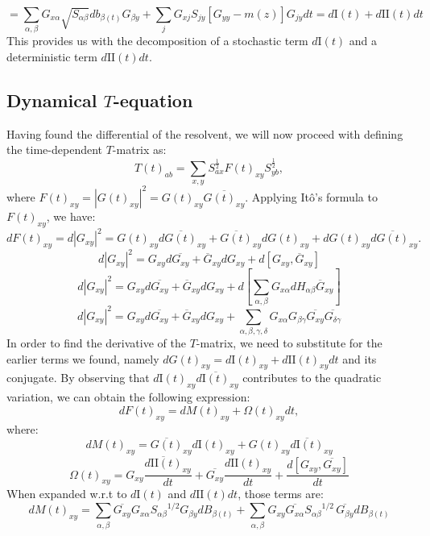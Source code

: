 \documentclass[11pt]{article}
\begin{document}
$$=\sum_{\alpha, \beta}G_{x\alpha}\sqrt{S_{\alpha \beta}}db_{\beta(t)}G_{\beta y}+\sum_j G_{xj}S_{jy}\left[G_{yy}-m(z)\right]G_{jy}dt = d \mathrm{I}(t) + d \mathrm{II}(t)dt$$
This provides us with the decomposition of a stochastic term $d \mathrm{I}(t)$ and a deterministic term $d \mathrm{II}(t)dt$. 


\subsection{Dynamical $T$-equation}
Having found the differential of the resolvent, we will now proceed with defining the time-dependent $T$-matrix as:
$$T(t)_{ab} = \sum_{x,y}S_{ax}^{\frac{1}{2}}F(t)_{xy}S_{yb}^{\frac{1}{2}},$$
where $F(t)_{xy} = |G(t)_{xy}|^2 = G(t)_{xy}\overline{G(t)_{xy}}$. 
Applying Itô's formula to \( F(t)_{xy} \), we have:
\[
dF(t)_{xy}= d|G_{xy}|^2= G(t)_{xy} d\overline{G(t)}_{xy} + \overline{G(t)}_{xy} dG(t)_{xy} + dG(t)_{xy} d\overline{G(t)}_{xy}.
\]
$$d|G_{xy}|^2 = G_{xy}d\overline{G_{xy}} + \overline{G}_{xy}dG_{xy} + d\left[G_{xy}, \overline{G}_{xy}\right]$$
 $$d|G_{xy}|^2 = G_{xy}d\overline{G_{xy}} + \overline{G}_{xy}dG_{xy} +d\left[\sum_{\alpha, \beta} G_{x\alpha}d H_{\alpha \beta}\overline{G}_{xy}\right]$$
$$d|G_{xy}|^2 = G_{xy}d\overline{G_{xy}} + \overline{G}_{xy}dG_{xy} +\sum_{\alpha,\beta, \gamma, \delta}G_{x\alpha}G_{\beta\gamma}\overline{G_{xy}}\overline{G_{\delta \gamma}}$$
In order to find the derivative of the $T$-matrix, we need to substitute for the earlier terms we found, namely \( dG(t)_{xy} = d\mathrm{I}(t)_{xy} + d\mathrm{II}(t)_{xy} dt \) and its conjugate. By observing that \( d\mathrm{I}(t)_{xy} d\overline{\mathrm{I}(t)}_{xy} \) contributes to the quadratic variation, we can obtain the following expression:
\[
dF(t)_{xy} = dM(t)_{xy} + \Omega(t)_{xy} dt,
\]
where:
\begin{equation*}
dM(t)_{xy} = \overline{G(t)}_{xy} d\mathrm{I}(t)_{xy} + G(t)_{xy} \overline{d\mathrm{I}(t)}_{xy} \end{equation*}
\begin{equation*}
\Omega(t)_{xy} = G_{xy}\frac{\overline{d\mathrm{II}(t)}_{xy}}{dt}+\overline{G_{xy}}\frac{d\mathrm{II}(t)_{xy}}{dt}+\frac{d\left[G_{xy}, \overline{G_{xy}}\right]}{dt}
\end{equation*}
When expanded w.r.t to $d\mathrm{I}(t)$ and $d\mathrm{II}(t)dt$, those terms are:
$$dM(t)_{xy} = \sum_{\alpha, \beta}\overline{G_{xy}}G_{x\alpha}{S_{\alpha\beta}}^{1/2}G_{\beta y}dB_{\beta(t)}+\sum_{\alpha, \beta}{G}_{xy}\overline{G_{x\alpha}}{S_{\alpha\beta}}^{1/2}\,\overline{G_{\beta y}}dB_{\beta(t)}$$
\end{document}
